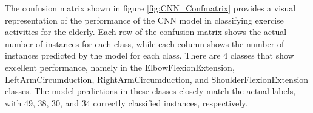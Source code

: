 The confusion matrix shown in figure \ref{fig:CNN_Confmatrix} provides a visual representation of the performance of the CNN model in classifying exercise activities for the elderly. Each row of the confusion matrix shows the actual number of instances for each class, while each column shows the number of instances predicted by the model for each class. There are 4 classes that show excellent performance, namely in the ElbowFlexionExtension, LeftArmCircumduction, RightArmCircumduction, and ShoulderFlexionExtension classes. The model predictions in these classes closely match the actual labels, with 49, 38, 30, and 34 correctly classified instances, respectively.


